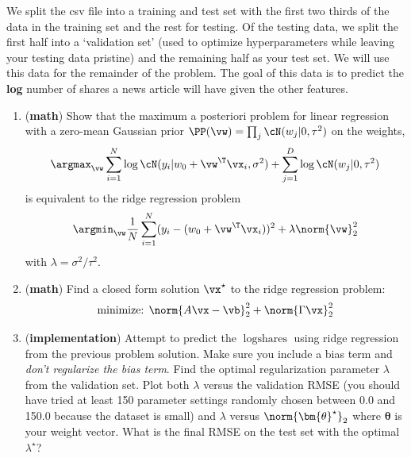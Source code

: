 \documentclass[189]{pset}
\begin{document}
    We split the csv file into a training and test set with the first
    two thirds of the data in the training set and the rest for
    testing. Of the testing data, we split the first half into a
    `validation set' (used to optimize hyperparameters while leaving
    your testing data pristine) and the remaining half as your test
    set. We will use this data for the remainder of the problem. The
    goal of this data is to predict the \textbf{log} number of shares
    a news article will have given the other features.

  \begin{enumerate}
    \item (\textbf{math}) Show that the maximum a posteriori problem
      for linear regression with a zero-mean Gaussian prior $\PP(\vw)
      = \prod_j \cN(w_j | 0, \tau^2)$ on the weights,
      \[
        \argmax_\vw \sum_{i=1}^N \log\cN(y_i | w_0 + \vw^\T\vx_i,
        \sigma^2) + \sum_{j=1}^D \log\cN(w_j | 0, \tau^2)
      \]
      is equivalent to the ridge regression problem
      \[
        \argmin_\vw \frac{1}{N}\sum_{i=1}^N (y_i - (w_0 +
        \vw^\T\vx_i))^2 + \lambda \norm{\vw}_2^2
      \]
      with $\lambda = \sigma^2 / \tau^2$.

    \item (\textbf{math}) Find a closed form solution $\vx^\star$ to
      the ridge regression problem:
    \[
      \text{minimize: } \norm{A\vx - \vb}_2^2 + \norm{\Gamma \vx}_2^2
    \]

  \item (\textbf{implementation}) Attempt to predict the
    $\log\text{shares}$ using ridge regression from the previous
    problem solution. Make sure you include a bias term and
    \textit{don't regularize the bias term}. Find the optimal
    regularization parameter $\lambda$ from the validation set. Plot
    both $\lambda$ versus the validation RMSE (you should have tried
    at least 150 parameter settings randomly chosen between 0.0 and
    150.0 because the dataset is small) and $\lambda$ versus
    $\norm{\bm{\theta}^\star}_2$ where $\bm{\theta}$ is your weight
    vector. What is the final RMSE on the test set with the optimal
    $\lambda^\star$?


\end{enumerate}
\end{document}
